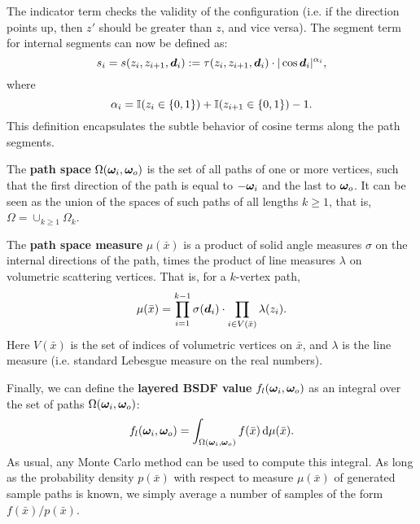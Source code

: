 The indicator term checks the validity of the configuration (i.e. if the direction points up, then $z'$ should be greater than $z$, and vice versa). The segment term for internal segments can now be defined as:
%
\begin{equation}
\label{eqn:seg_contrib}
s_i = s(z_i, z_{i + 1}, \bm{d}_i) := \tau(z_i, z_{i+1}, \bm{d}_i) \cdot |\cos \bm{d}_i|^{\alpha_i},
\end{equation}
where
\begin{equation}
\label{eqn:seg_contrib_cosine}
\alpha_i = \mathbb{I}(z_i \in \{0,1\}) + \mathbb{I}(z_{i + 1} \in \{0,1\}) - 1.
\end{equation}
%
This definition encapsulates the subtle behavior of cosine terms along the path segments.
\begin{comment}
A segment between two layer interface vertices will have a single cosine term, a segment between two volume scattering vertices will have a cosine term in the denominator, and a mixed interface/volume segment will have no cosine term. Note the symmetry of this definition with respect to light/camera reversal. The reason for this behavior can be found in the derivation below.
\end{comment}

The {\bf path space} $\Omega(\bm{\omega}_i, \bm{\omega}_o)$ is the set of all paths of one or more vertices, such that the first direction of the path is equal to $-\bm{\omega}_i$ and the last to $\bm{\omega}_o$. It can be seen as the union of the spaces of such paths of all lengths $k \geq 1$, that is, $\Omega = \cup_{k \geq 1} \Omega_k$.

The {\bf path space measure} $\mu(\bar x)$ is a product of solid angle measures $\sigma$ on the internal directions of the path, times the product of line measures $\lambda$ on volumetric scattering vertices.
That is, for a $k$-vertex path,
\begin{equation}
\mu(\bar x) = \prod_{i=1}^{k-1} \sigma(\bm{d}_i) \cdot \prod_{i \in V(\bar x)} \lambda(z_i).
\end{equation}
Here $V(\bar x)$ is the set of indices of volumetric vertices on $\bar x$, and $\lambda$ is the line measure (i.e. standard Lebesgue measure on the real numbers).

Finally, we can define the {\bf layered BSDF value} $f_l(\bm{\omega}_i, \bm{\omega}_o)$ as an integral over the set of paths $\Omega(\bm{\omega}_i, \bm{\omega}_o)$:
%
\begin{equation}
\label{eq:pathintegral}
	f_l(\bm{\omega}_i, \bm{\omega}_o) = \int_{\Omega(\bm{\omega}_i, \bm{\omega}_o)} f(\bar x) \,\mathrm{d} \mu(\bar x).
\end{equation}
%
As usual, any Monte Carlo method can be used to compute this integral. As long as the probability density $p(\bar x)$ with respect to measure $\mu(\bar x)$ of generated sample paths is known, we simply average a number of samples of the form $f(\bar x) / p(\bar x)$.

